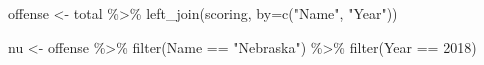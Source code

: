 \documentclass[
]{book}
\newenvironment{Shaded}{\begin{snugshade}}{\end{snugshade}}
\newcommand{\AttributeTok}[1]{\textcolor[rgb]{0.77,0.63,0.00}{#1}}
\newcommand{\DecValTok}[1]{\textcolor[rgb]{0.00,0.00,0.81}{#1}}
\newcommand{\FunctionTok}[1]{\textcolor[rgb]{0.00,0.00,0.00}{#1}}
\newcommand{\NormalTok}[1]{#1}
\newcommand{\OtherTok}[1]{\textcolor[rgb]{0.56,0.35,0.01}{#1}}
\newcommand{\SpecialCharTok}[1]{\textcolor[rgb]{0.00,0.00,0.00}{#1}}
\newcommand{\StringTok}[1]{\textcolor[rgb]{0.31,0.60,0.02}{#1}}
\begin{document}
\begin{Shaded}
\begin{Highlighting}[]
\NormalTok{offense }\OtherTok{\textless{}{-}}\NormalTok{ total }\SpecialCharTok{\%\textgreater{}\%} \FunctionTok{left\_join}\NormalTok{(scoring, }\AttributeTok{by=}\FunctionTok{c}\NormalTok{(}\StringTok{"Name"}\NormalTok{, }\StringTok{"Year"}\NormalTok{))}

\NormalTok{nu }\OtherTok{\textless{}{-}}\NormalTok{ offense }\SpecialCharTok{\%\textgreater{}\%} \FunctionTok{filter}\NormalTok{(Name }\SpecialCharTok{==} \StringTok{"Nebraska"}\NormalTok{) }\SpecialCharTok{\%\textgreater{}\%} \FunctionTok{filter}\NormalTok{(Year }\SpecialCharTok{==} \DecValTok{2018}\NormalTok{)}
\end{Highlighting}
\end{Shaded}
\end{document}
